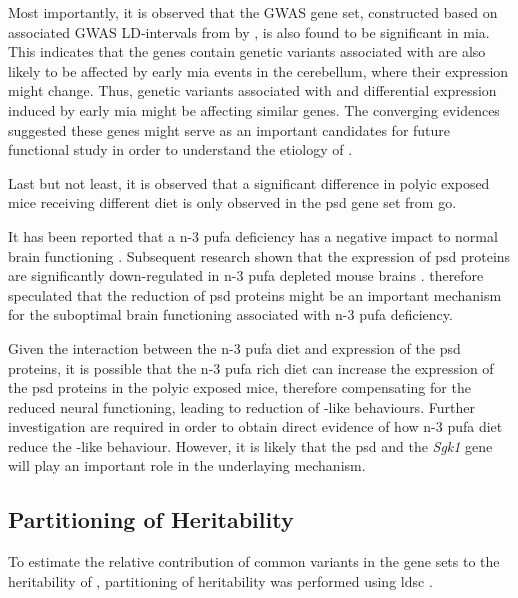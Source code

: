 Most importantly, it is observed that the  \gls{GWAS} gene set, constructed based on associated \gls{GWAS} \gls{LD}-intervals from \citet{Ripke2013} by \citet{Purcell2014}, is also found to be significant in \gls{mia}.
This indicates that the genes contain genetic variants associated with  are also likely to be affected by early \gls{mia} events in the cerebellum, where their expression might change. 
Thus, genetic variants associated with  and differential expression induced by early \gls{mia} might be affecting similar genes.
The converging evidences suggested these genes might serve as an important candidates for future functional study in order to understand the etiology of .

Last but not least, it is observed that a significant difference in \gls{polyic} exposed mice receiving different diet is only observed in the \gls{psd} gene set from \gls{go}.

It has been reported that a n-3 \gls{pufa} deficiency has a negative impact to normal brain functioning \citep{Bazinet2014,Calon2005}.
Subsequent research shown that the expression of \gls{psd} proteins are significantly down-regulated in n-3 \gls{pufa} depleted mouse brains \citep{Sidhu2011}.
\citet{Sidhu2011} therefore speculated that the reduction of \gls{psd} proteins might be an important mechanism for the suboptimal brain functioning associated with n-3 \gls{pufa} deficiency.

Given the interaction between the n-3 \gls{pufa} diet and expression of the \gls{psd} proteins, it is possible that the n-3 \gls{pufa} rich diet can increase the expression of the \gls{psd} proteins in the \gls{polyic} exposed mice, therefore compensating for the reduced neural functioning, leading to reduction of -like behaviours. 
Further investigation are required in order to obtain direct evidence of how n-3 \gls{pufa} diet reduce the -like behaviour.
However, it is likely that the \gls{psd} and the \textit{Sgk1} gene will play an important role in the underlaying mechanism.

\subsection{Partitioning of Heritability}
To estimate the relative contribution of common variants in the gene sets to the heritability of , partitioning of heritability was performed using \gls{ldsc} \citet{Bulik-Sullivan2015}.

